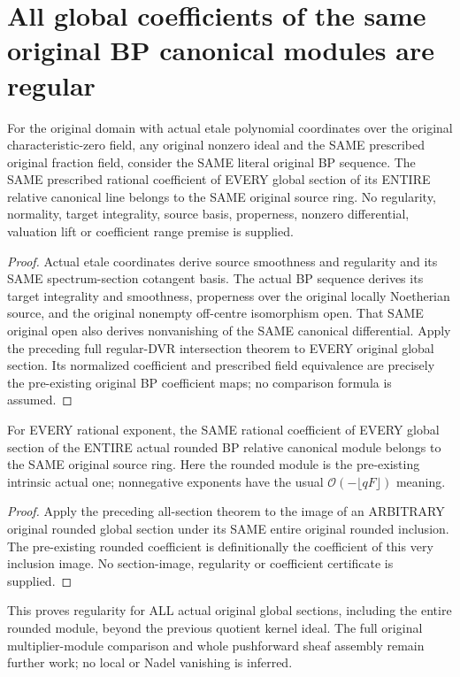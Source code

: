 \section{All global coefficients of the same original BP canonical modules are regular}
\label{sec:bp-global-canonical-regularity}

\begin{theorem}
\label{sc0-bp-global-canonical-regularity:all-line-sections}
\leanok
For the original domain with actual etale polynomial coordinates
over the original characteristic-zero field, any original nonzero
ideal and the SAME prescribed original fraction field, consider
the SAME literal original BP sequence. The SAME prescribed rational
coefficient of EVERY global section of its ENTIRE relative canonical
line belongs to the SAME original source ring. No regularity,
normality, target integrality, source basis, properness, nonzero
differential, valuation lift or coefficient range premise is supplied.
\end{theorem}
\begin{proof}
Actual etale coordinates derive source smoothness and regularity
and its SAME spectrum-section cotangent basis. The actual BP
sequence derives its target integrality and smoothness, properness
over the original locally Noetherian source, and the original
nonempty off-centre isomorphism open. That SAME original open
also derives nonvanishing of the SAME canonical differential.
Apply the preceding full regular-DVR intersection theorem to
EVERY original global section. Its normalized coefficient and
prescribed field equivalence are precisely the pre-existing
original BP coefficient maps; no comparison formula is assumed.
\end{proof}

\begin{theorem}
\label{sc0-bp-global-canonical-regularity:all-rounded-sections}
\leanok
For EVERY rational exponent, the SAME rational coefficient of
EVERY global section of the ENTIRE actual rounded BP relative
canonical module belongs to the SAME original source ring.
Here the rounded module is the pre-existing intrinsic actual
one; nonnegative exponents have the usual
$\mathcal O(-\lfloor qF\rfloor)$ meaning.
\end{theorem}
\begin{proof}
Apply the preceding all-section theorem to the image of an
ARBITRARY original rounded global section under its SAME entire
original rounded inclusion. The pre-existing rounded coefficient
is definitionally the coefficient of this very inclusion image.
No section-image, regularity or coefficient certificate is supplied.
\end{proof}

This proves regularity for ALL actual original global sections,
including the entire rounded module, beyond the previous quotient
kernel ideal. The full original multiplier-module comparison and
whole pushforward sheaf assembly remain further work; no local or
Nadel vanishing is inferred.
